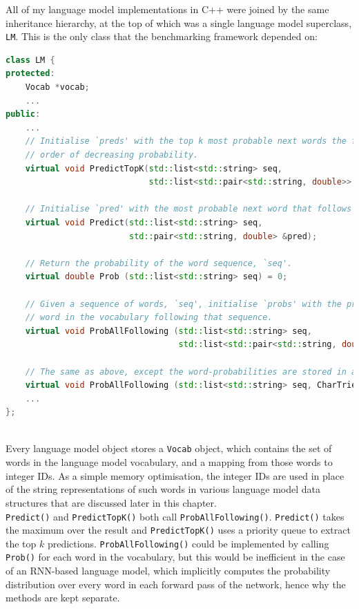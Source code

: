 \documentclass[a4paper, 12pt]{report}
\newcommand{\ttt}[1]{\texttt{#1}}
\begin{document}
All of my language model implementations in C++ were joined by the same inheritance hierarchy, at the top of which was a single language model superclass, \ttt{LM}. This is the only class that the benchmarking framework depended on: \\

\begin{lstlisting}[language=C++]
class LM {
protected:
    Vocab *vocab;
    ...
public:
    ...
    // Initialise `preds' with the top k most probable next words the follow `seq', in
    // order of decreasing probability.
    virtual void PredictTopK(std::list<std::string> seq,
                             std::list<std::pair<std::string, double>> &preds, int k);

    // Initialise `pred' with the most probable next word that follows `seq'.
    virtual void Predict(std::list<std::string> seq,
                         std::pair<std::string, double> &pred);

    // Return the probability of the word sequence, `seq'.
    virtual double Prob (std::list<std::string> seq) = 0;
    
    // Given a sequence of words, `seq', initialise `probs' with the probability of each
    // word in the vocabulary following that sequence.
    virtual void ProbAllFollowing (std::list<std::string> seq,
                                   std::list<std::pair<std::string, double>> &probs) = 0;
    
    // The same as above, except the word-probabilities are stored in a character trie.
    virtual void ProbAllFollowing (std::list<std::string> seq, CharTrie *probs) = 0;
    ...
};
\end{lstlisting}
~\\

Every language model object stores a \ttt{Vocab} object, which contains the set of words in the language model vocabulary, and a mapping from those words to integer IDs. As a simple memory optimisation, the integer IDs are used in place of the string representations of such words in various language model data structures that are discussed later in this chapter. \\

\ttt{Predict()} and \ttt{PredictTopK()} both call \ttt{ProbAllFollowing()}. \ttt{Predict()} takes the maximum over the result and \ttt{PredictTopK()} uses a priority queue to extract the top $k$ predictions. \ttt{ProbAllFollowing()} could be implemented by calling \ttt{Prob()} for each word in the vocabulary, but this would be inefficient in the case of an RNN-based language model, which implicitly computes the probability distribution over every word in each forward pass of the network, hence why the methods are kept separate. \\
\end{document}
